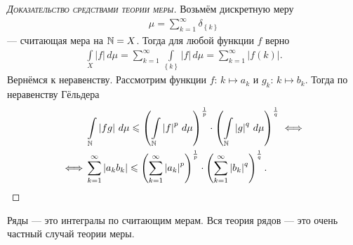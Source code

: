 \begin{proof}[\normalfont\textsc{Доказательство средствами теории меры}]
 Возьмём дискретную меру \begin{align*}
  \mu = \sum_{k=1}^{\infty} \delta_{\left\{ k \right\}}
 \end{align*} --- считающая мера на $\mathbb{N} = X$. Тогда для любой функции  $f$ верно \begin{align*}
  \int\limits_{X} \left| f \right| \, d\mu = \sum_{k=1}^{\infty} \int\limits_{\left\{ k \right\}} \left| f \right| \, d\mu  = \sum_{k=1}^{\infty} \left| f(k) \right|
 .\end{align*} Вернёмся к неравенству. Рассмотрим функции $f \colon\, k \mapsto a_k $ и $g_k \colon\, k \mapsto b_k$. Тогда по неравенству Гёльдера \begin{align*}
 &\int\limits_{\mathbb{N}} \left| fg \right| \, d\mu \leqslant \left( \int\limits_{\mathbb{N}} \left| f \right|^{p} \, d\mu   \right) ^{\frac{1}{p}} \cdot \left( \int\limits_{\mathbb{N}} \left| g \right|^{q} \, d\mu   \right)^{\frac{1}{q}} \iff \\ 
 \iff & \sum_{k=1}^{\infty} \left| a_k b_k \right| \leqslant \left( \sum_{k=1}^{\infty} \left| a_k \right|^{p} \right)^{\frac{1}{p}} \cdot \left( \sum_{k=1}^{\infty} \left| b_k \right|^{q} \right)^{\frac{1}{q}}
 .\end{align*} 
\end{proof}

Ряды --- это интегралы по считающим мерам. Вся теория рядов --- это очень частный случай теории меры.

